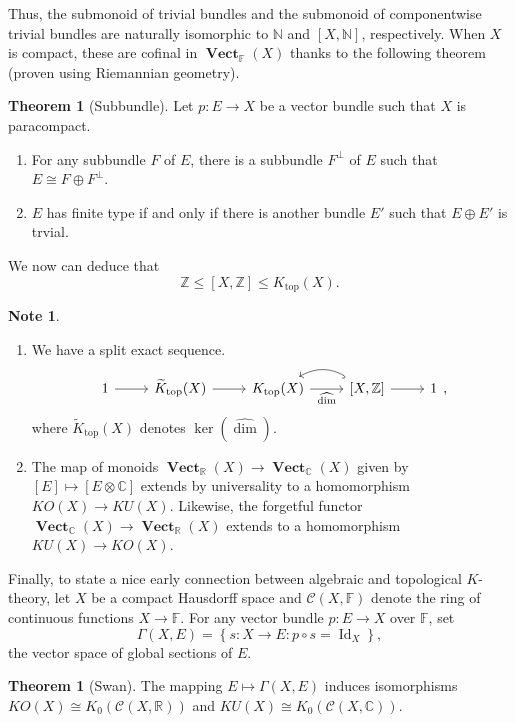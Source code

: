 \documentclass[10pt,letterpaper,cm]{nupset}
\theoremstyle{definition}
\newtheorem{note}[definition]{Note}
\theoremstyle{theorem}
\newtheorem{theorem}[definition]{Theorem}
\theoremstyle{remark}
\newcommand{\C}{\mathbb C}
\newcommand{\F}{\mathbb F}
\newcommand{\N}{\mathbb N}
\newcommand{\R}{\mathbb R}
\newcommand{\Z}{\mathbb Z}
\newcommand{\1}{\mathbf{1}}
\newcommand{\0}{\vec 0}
\DeclareMathOperator{\id}{Id}
\DeclareMathOperator{\vect}{\mathbf{Vect}}
\DeclareMathOperator{\topp}{\mathrm{top}}
\begin{document}
Thus, the submonoid  of trivial bundles and the submonoid of componentwise trivial bundles are naturally isomorphic to $\N$ and $\left[X, \N\right]$, respectively.  When $X$ is compact, these are cofinal in $\vect_{\F}(X)$ thanks to the following theorem (proven using Riemannian geometry). 

\begin{theorem}[Subbundle]
Let $p: E \to X$ be a vector bundle such that $X$ is paracompact.
\begin{enumerate}[label=(\alph*)]
\item For any subbundle $F$ of $E$, there is a subbundle $F^{\perp}$ of $E$ such that $E \cong F \oplus F^{\perp}$.
\item $E$ has finite type if and only if there is another bundle $E'$ such that $E\oplus E'$ is trvial.
\end{enumerate}
\end{theorem}

We now can deduce that $$\Z \leq \left[X, \Z\right] \leq K_{\topp}(X).$$

\medskip

\begin{note} $ $
\begin{enumerate}
\item We have a split exact sequence. 
\[
\begin{tikzcd}
1 \arrow[r] & \widetilde{K}_{\topp}(X) \arrow[r] & K_{\topp}(X) \arrow[r, "\widehat{\dim}"'] & {[X, \mathbb Z]} \arrow[r] \arrow[l, hook, bend right] & 1
\end{tikzcd},
\] where $\widetilde{K}_{\topp}(X)$ denotes $\ker\left(\widehat{\dim}\right)$.
\item The map of monoids $\vect_{\R}(X) \to \vect_{\C}(X)$ given by $\left[E\right] \mapsto \left[E \otimes \C\right]$ extends by universality to a homomorphism $KO(X) \to KU(X)$. Likewise, the forgetful functor $\vect_{\C}(X) \to \vect_{\R}(X)$ extends to a homomorphism $KU(X) \to KO(X)$.
\end{enumerate}
\end{note}

\medskip

Finally, to state a nice early connection between algebraic and topological $K$-theory, let $X$ be a compact Hausdorff space and $\mathcal C(X, \F)$ denote the ring of continuous functions $X \to \F$. For any vector bundle $p: E \to X$ over $\F$, set $$\Gamma(X, E) = \left\{s: X \to E : p \circ s = \id_X\right\},$$ the vector space of global sections of $E$.

\begin{theorem}[Swan]\label{swan}
The mapping $E \mapsto \Gamma(X, E)$ induces isomorphisms $KO(X) \cong K_0(\mathcal C(X, \R))$ and $KU(X) \cong K_0( \mathcal C(X, \C))$.
\end{theorem}
\end{document}
